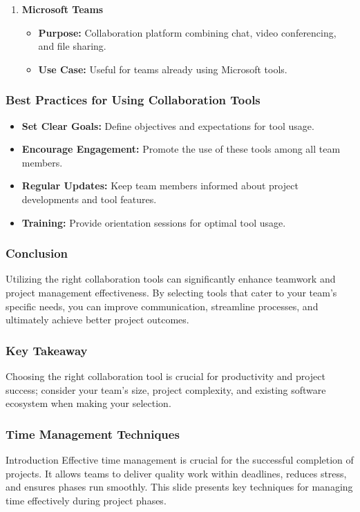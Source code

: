 \documentclass[aspectratio=169]{beamer}
\begin{document}
\begin{frame}[fragile]
\begin{enumerate}
        \item \textbf{Microsoft Teams}
        \begin{itemize}
            \item \textbf{Purpose:} Collaboration platform combining chat, video conferencing, and file sharing.
            \item \textbf{Use Case:} Useful for teams already using Microsoft tools.
        \end{itemize}
    \end{enumerate}
\end{frame}

\begin{frame}[fragile]
    \frametitle{Best Practices for Using Collaboration Tools}
    \begin{itemize}
        \item \textbf{Set Clear Goals:} Define objectives and expectations for tool usage.
        \item \textbf{Encourage Engagement:} Promote the use of these tools among all team members.
        \item \textbf{Regular Updates:} Keep team members informed about project developments and tool features.
        \item \textbf{Training:} Provide orientation sessions for optimal tool usage.
    \end{itemize}
\end{frame}

\begin{frame}[fragile]
    \frametitle{Conclusion}
    Utilizing the right collaboration tools can significantly enhance teamwork and project management effectiveness. By selecting tools that cater to your team’s specific needs, you can improve communication, streamline processes, and ultimately achieve better project outcomes.
\end{frame}

\begin{frame}[fragile]
    \frametitle{Key Takeaway}
    Choosing the right collaboration tool is crucial for productivity and project success; consider your team's size, project complexity, and existing software ecosystem when making your selection.
\end{frame}

\begin{frame}[fragile]
    \frametitle{Time Management Techniques}
    \begin{block}{Introduction}
        Effective time management is crucial for the successful completion of projects. It allows teams to deliver quality work within deadlines, reduces stress, and ensures phases run smoothly. This slide presents key techniques for managing time effectively during project phases.
    \end{block}
\end{frame}
\end{document}

